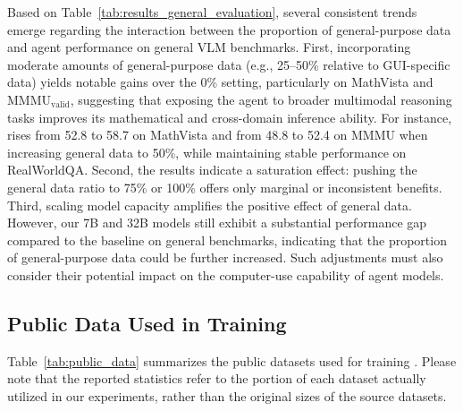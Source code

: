 Based on Table~\ref{tab:results_general_evaluation}, several consistent trends emerge regarding the interaction between the proportion of general-purpose data and agent performance on general VLM benchmarks. First, incorporating moderate amounts of general-purpose data (e.g., 25–50\% relative to GUI-specific data) yields notable gains over the 0\% setting, particularly on MathVista and MMMU$_{\text{valid}}$, suggesting that exposing the agent to broader multimodal reasoning tasks improves its mathematical and cross-domain inference ability. For instance,  rises from 52.8 to 58.7 on MathVista and from 48.8 to 52.4 on MMMU when increasing general data to 50\%, while maintaining stable performance on RealWorldQA. Second, the results indicate a saturation effect: pushing the general data ratio to 75\% or 100\% offers only marginal or inconsistent benefits. Third, scaling model capacity amplifies the positive effect of general data. 
However, our 7B and 32B models still exhibit a substantial performance gap compared to the baseline on general benchmarks, indicating that the proportion of general-purpose data could be further increased. Such adjustments must also consider their potential impact on the computer-use capability of agent models.

\subsection{Public Data Used in Training}
Table~\ref{tab:public_data} summarizes the public datasets used for training \modelname. Please note that the reported statistics refer to the portion of each dataset actually utilized in our experiments, rather than the original sizes of the source datasets.



